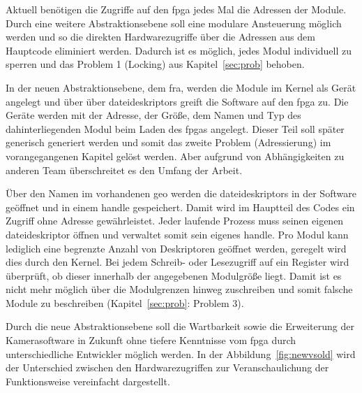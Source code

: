Aktuell benötigen die Zugriffe auf den \ac{fpga} jedes Mal die Adressen der Module. Durch eine weitere Abstraktionsebene soll eine modulare Ansteuerung möglich werden und so die direkten Hardwarezugriffe über die Adressen aus dem Hauptcode eliminiert werden. Dadurch ist es möglich, jedes Modul individuell zu sperren und das Problem 1 (Locking) aus Kapitel~\ref{sec:prob} behoben.


In der neuen Abstraktionsebene, dem \ac{fra}, werden die Module im Kernel als Gerät angelegt und über über \glspl{dateideskriptor} greift die Software auf den \ac{fpga} zu. Die Geräte werden mit der Adresse, der Größe, dem Namen und Typ des dahinterliegenden Modul beim Laden des \ac{fpga}s angelegt. Dieser Teil soll später generisch generiert werden und somit das zweite Problem (Adressierung) im vorangegangenen Kapitel gelöst werden. Aber aufgrund von Abhängigkeiten zu anderen Team überschreitet es den Umfang der Arbeit.



Über den Namen im vorhandenen \ac{geo} werden die \glspl{dateideskriptor} in der Software geöffnet und in einem \gls{handle} gespeichert. Damit wird im Hauptteil des Codes ein Zugriff ohne Adresse gewährleistet. Jeder laufende Prozess muss seinen eigenen \gls{dateideskriptor} öffnen und verwaltet somit sein eigenes \gls{handle}. Pro Modul kann lediglich eine begrenzte Anzahl von Deskriptoren geöffnet werden, geregelt wird dies durch den Kernel. 
Bei jedem Schreib- oder Lesezugriff auf ein Register wird überprüft, ob dieser innerhalb der angegebenen Modulgröße liegt. Damit ist es nicht mehr möglich über die Modulgrenzen hinweg zuschreiben und somit falsche Module zu beschreiben (Kapitel~\ref{sec:prob}: Problem 3).



Durch die neue Abstraktionsebene soll die Wartbarkeit sowie die Erweiterung der Kamerasoftware in Zukunft ohne tiefere Kenntnisse vom \ac{fpga} durch unterschiedliche Entwickler möglich werden. In der Abbildung~\ref{fig:newvsold} wird der Unterschied zwischen den Hardwarezugriffen zur Veranschaulichung der Funktionsweise vereinfacht dargestellt.




